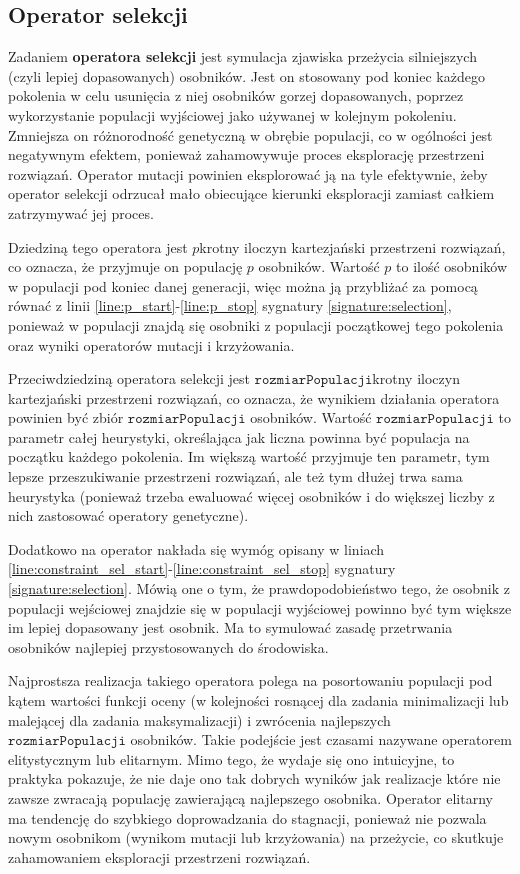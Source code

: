 \documentclass[twoside]{iisthesis}
\newcommand{\param}[1]{\mathtt{#1}}
\begin{document}
\subsection{Operator selekcji} \label{subsection:natSel}

Zadaniem \textbf{operatora selekcji} jest symulacja zjawiska przeżycia silniejszych (czyli lepiej dopasowanych) osobników. Jest on stosowany pod koniec każdego pokolenia w celu usunięcia z niej osobników gorzej dopasowanych, poprzez wykorzystanie populacji wyjściowej jako używanej w kolejnym pokoleniu. Zmniejsza on różnorodność genetyczną w obrębie populacji, co w ogólności jest negatywnym efektem, ponieważ zahamowywuje proces eksplorację przestrzeni rozwiązań. Operator mutacji powinien eksplorować ją na tyle efektywnie, żeby operator selekcji odrzucał mało obiecujące kierunki eksploracji zamiast całkiem zatrzymywać jej proces.

Dziedziną tego operatora jest $p$krotny iloczyn kartezjański przestrzeni rozwiązań, co oznacza, że przyjmuje on populację $p$ osobników. Wartość $p$ to ilość osobników w populacji pod koniec danej generacji, więc można ją przybliżać za pomocą równać z linii \ref{line:p_start}-\ref{line:p_stop} sygnatury \ref{signature:selection}, ponieważ w populacji znajdą się osobniki z populacji początkowej tego pokolenia oraz wyniki operatorów mutacji i krzyżowania. 

Przeciwdziedziną operatora selekcji jest $\param{rozmiarPopulacji}$krotny iloczyn kartezjański przestrzeni rozwiązań, co oznacza, że wynikiem działania operatora powinien być zbiór $\param{rozmiarPopulacji}$ osobników. Wartość $\param{rozmiarPopulacji}$ to parametr całej heurystyki, określająca jak liczna powinna być populacja na początku każdego pokolenia. Im większą wartość przyjmuje ten parametr, tym lepsze przeszukiwanie przestrzeni rozwiązań, ale też tym dłużej trwa sama heurystyka (ponieważ trzeba ewaluować więcej osobników i do większej liczby z nich zastosować operatory genetyczne). 

Dodatkowo na operator nakłada się wymóg opisany w liniach \ref{line:constraint_sel_start}-\ref{line:constraint_sel_stop} sygnatury \ref{signature:selection}. Mówią one o tym, że prawdopodobieństwo tego, że osobnik z populacji wejściowej znajdzie się w populacji wyjściowej powinno być tym większe im lepiej dopasowany jest osobnik. Ma to symulować zasadę przetrwania osobników najlepiej przystosowanych do środowiska.

Najprostsza realizacja takiego operatora polega na posortowaniu populacji pod kątem wartości funkcji oceny (w kolejności rosnącej dla zadania minimalizacji lub malejącej dla zadania maksymalizacji) i zwrócenia najlepszych $\param{rozmiarPopulacji}$ osobników. Takie podejście jest czasami nazywane operatorem elitystycznym lub elitarnym. Mimo tego, że wydaje się ono intuicyjne, to praktyka pokazuje, że nie daje ono tak dobrych wyników jak realizacje które nie zawsze zwracają populację zawierającą najlepszego osobnika. Operator elitarny ma tendencję do szybkiego doprowadzania do stagnacji, ponieważ nie pozwala nowym osobnikom (wynikom mutacji lub krzyżowania) na przeżycie, co skutkuje zahamowaniem eksploracji przestrzeni rozwiązań.
\end{document}
